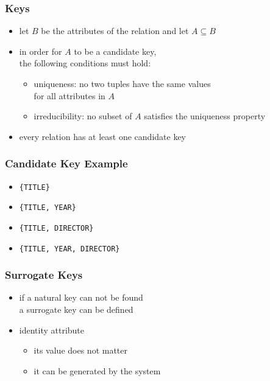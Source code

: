 \documentclass[dvipsnames]{beamer}
\theoremstyle{plain}
\begin{document}
\begin{frame}
  \frametitle{Keys}

  \begin{itemize}
    \item let $B$ be the attributes of the relation and let $A \subseteq B$

    \item in order for $A$ to be a candidate key,\\
      the following conditions must hold:

    \pause
    \begin{itemize}
      \item \alert{uniqueness}: no two tuples have the same values\\
        for all attributes in $A$

      \pause
      \item \alert{irreducibility}: no subset of $A$ satisfies the uniqueness
        property
    \end{itemize}

    \pause
    \item every relation has at least one candidate key
  \end{itemize}
\end{frame}

\begin{frame}
  \frametitle{Candidate Key Example}

  \begin{example}
    \begin{itemize}
      \item \texttt{\{TITLE\}}

      \pause
      \item \texttt{\{TITLE, YEAR\}}

      \pause
      \item \texttt{\{TITLE, DIRECTOR\}}

      \pause
      \item \texttt{\{TITLE, YEAR, DIRECTOR\}}
    \end{itemize}
  \end{example}
\end{frame}

\begin{frame}
  \frametitle{Surrogate Keys}

  \begin{itemize}
    \item if a \alert{natural key} can not be found\\
      a \alert{surrogate key} can be defined

    \pause
    \medskip
    \item identity attribute
    \begin{itemize}
      \item its value does not matter
      \item it can be generated by the system
    \end{itemize}
  \end{itemize}
\end{frame}
\end{document}
